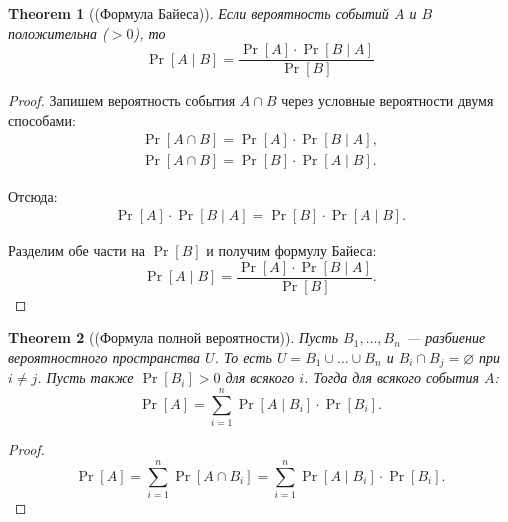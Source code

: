 \documentclass[a4paper]{article}
\theoremstyle{named}
\newtheorem*{namedtheorem}{Theorem}
\begin{document}
\begin{colloq}
        \begin{namedtheorem}[(Формула Байеса)]
            Если вероятность событий $A$ и $B$ положительна ($> 0$), то
            \begin{equation*}
                \Pr[A \mid B] = \dfrac{\Pr[A] \cdot \Pr[B \mid A]}{\Pr[B]}
            \end{equation*}
        \end{namedtheorem}

        \begin{proof}
            Запишем вероятность события $A \cap B$ через условные вероятности двумя способами:
            \[\begin{gathered}
                \Pr[A \cap B] = \Pr[A] \cdot \Pr[B \mid A], \\
                \Pr[A \cap B] = \Pr[B] \cdot \Pr[A \mid B].
            \end{gathered}\]

            Отсюда:
            \[\begin{gathered}
                \Pr[A] \cdot \Pr[B \mid A] = \Pr[B] \cdot \Pr[A \mid B].
            \end{gathered}\]

            Разделим обе части на $\Pr[B]$ и получим формулу Байеса:
            \begin{equation*}
                \Pr[A \mid B] = \dfrac{\Pr[A] \cdot \Pr[B \mid A]}{\Pr[B]}.
            \end{equation*}
        \end{proof}

        \begin{namedtheorem}[(Формула полной вероятности)]
            Пусть $B_1, \dots, B_n$ --- разбиение вероятностного пространства $U$. То есть $U = B_1 \cup \dots \cup B_n$ и $B_i \cap B_j = \varnothing$ при $i \neq j$. Пусть также $\Pr[B_i] > 0$ для всякого $i$. Тогда для всякого события $A$:
            \begin{equation*}
                \Pr[A] = \sum_{i = 1}^n \Pr[A \mid B_i] \cdot \Pr[B_i].
            \end{equation*}
        \end{namedtheorem}

        \begin{proof}
            \begin{equation*}
                \Pr[A] = \sum_{i = 1}^n \Pr[A \cap B_i] = \sum_{i = 1}^n \Pr[A \mid B_i] \cdot \Pr[B_i].
            \end{equation*}


\end{proof}
\end{colloq}
\end{document}
